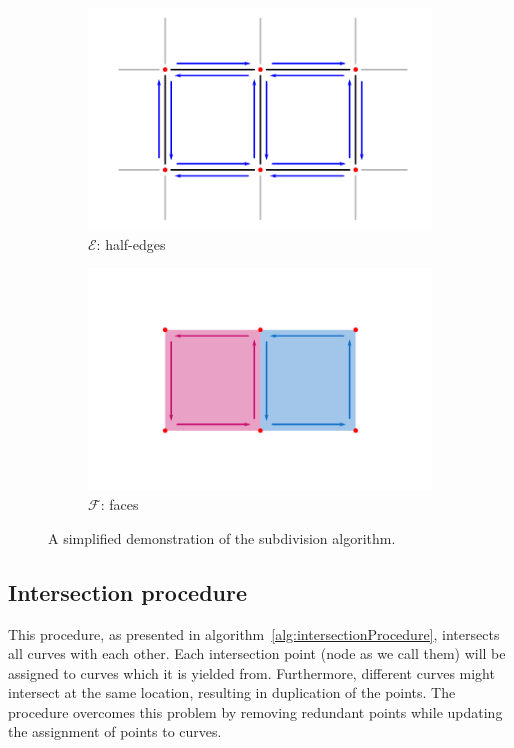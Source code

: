 \begin{figure}
  \begin{subfigure}{.4\textwidth}
    \includegraphics[width=\textwidth]{figures/subd_simpleExample_c.png}
    \caption{$\mathcal{E}$: half-edges} \label{subfig:subd_simpleExample_c}
  \end{subfigure}%
  \quad \quad%
  \begin{subfigure}{.4\textwidth}
    \includegraphics[width=\textwidth]{figures/subd_simpleExample_d.png}
    \caption{$\mathcal{F}$: faces} \label{subfig:subd_simpleExample_d}
  \end{subfigure}%
  \caption[xxx]
          {A simplified demonstration of the subdivision algorithm.}
  \label{fig:subd_simpleExample}
\end{figure}


\subsection{Intersection procedure}
This procedure, as presented in algorithm~\ref{alg:intersectionProcedure}, intersects all curves with each other.
Each intersection point (node as we call them) will be assigned to curves which it is yielded from.
Furthermore, different curves might intersect at the same location, resulting in duplication of the points.
The procedure overcomes this problem by removing redundant points while updating the assignment of points to curves.

